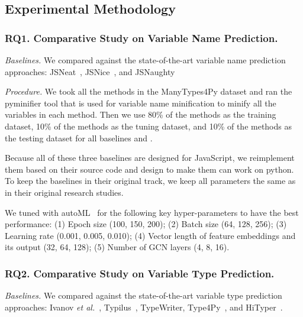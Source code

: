 

\subsection{Experimental Methodology}
\label{empirical-method}

\subsubsection{RQ1. Comparative Study on Variable Name Prediction.}

{\em Baselines.} We compared {\tool} against the state-of-the-art variable name prediction approaches: JSNeat~\cite{tran2019recovering}, JSNice~\cite{JSNice2015}, and JSNaughty~\cite{JSNaughty2017} 

\textit{Procedure.} We took all the methods in the ManyTypes4Py dataset and ran the pyminifier \cite{pyminifier} tool that is used for variable name minification to minify all the variables in each method. Then we use 80\% of the methods as the training dataset, 10\% of the methods as the tuning dataset, and 10\% of the methods as the testing dataset for all baselines and {\tool}.

Because all of these three baselines are designed for JavaScript, we reimplement them based on their source code and design to make them can work on python. To keep the baselines in their original track, we keep all parameters the same as in their original research studies.

We tuned {\tool} with autoML~\cite{NNI} for the following key hyper-parameters to have the best performance: (1) Epoch size (100, 150, 200); (2) Batch size (64, 128, 256); (3) Learning rate (0.001, 0.005, 0.010); (4) Vector length of feature embeddings and its
output (32, 64, 128); (5) Number of GCN layers (4, 8, 16). 

\subsubsection{RQ2. Comparative Study on Variable Type Prediction.}

{\em Baselines.} We compared {\tool} against the state-of-the-art
  variable type prediction approaches: Ivanov {\em et
  al.}~\cite{ivanov21predicting}, Typilus~\cite{typilus-pldi20},
  TypeWriter\cite{typewriter-fse20}, Type4Py~\cite{Type4Py-icse22},
  and HiTyper~\cite{HiTyper-icse22}.


